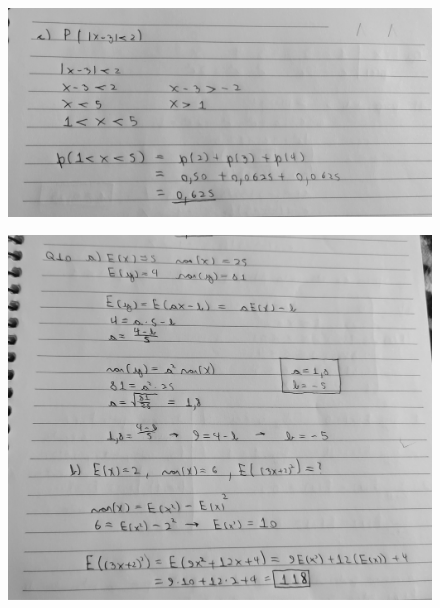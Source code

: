 \documentclass[12pt]{article}
\begin{document}
	\begin{figure}[h!]
		\includegraphics[scale=0.33]{q2c}
	\end{figure}
\vspace{+12pt}

	\begin{figure}[h!]
		\includegraphics[scale=0.38]{q10}
	\end{figure}
\vspace{+12pt}	
\end{document}
